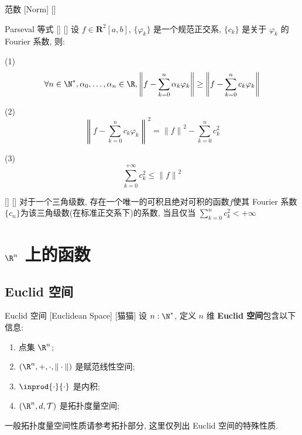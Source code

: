 \documentclass[UTF8]{ctexart}
\begin{document}
			\begin{dfn}
                    []
                    {范数}
                    [Norm]
                    []
			\end{dfn}

			\begin{thm}
			    []
			    {Parseval 等式}
			    []
			    []
				设 \(f\in\mathbf{R}^2[a,b]\), \(\{\varphi_k\}\) 是一个规范正交系, \(\{c_k\}\) 是关于 \(\varphi_k\) 的 Fourier 系数, 则: 
				
				(1)
				\[\forall n\in\N^*, \alpha_0,\dots,\alpha_n\in\R, \left\|f-\sum_{k=0}^{n}\alpha_k\varphi_k\right\|\geq\left\|f-\sum_{k=0}^{n}c_k\varphi_k\right\|\]

				(2)
				\[{\left\|f-\sum_{k=0}^{n}c_k\varphi_k\right\|}^2={\|f\|}^2-\sum_{k=0}^{n}c_k^2\]

				(3)
				\[\sum_{k=0}^{+\infty}c_k^2\leq{\|f\|}^2\]
			\end{thm}

			\begin{crl}
			    []
			    {}
			    []
			    []
				对于一个三角级数, 存在一个唯一的可积且绝对可积的函数\(f\)使其 Fourier 系数\(\{c_n\}\)为该三角级数(在标准正交系下)的系数, 当且仅当 \(\sum_{k=0}^{n}c_k^2<+\infty\)
			\end{crl}

    \section{\(\R^n\) 上的函数}

		\subsection{Euclid 空间}
			
			\begin{str}
				{Euclid 空间}
				[Euclidean Space]
				[猫猫]
				设 \(n:\N^*\), 定义 \(n\) 维 \textbf{Euclid 空间}包含以下信息: 
				\begin{enumerate}
					\item 点集 \(\R^n\); 
					\item \((\R^n, +, \cdot, \|\cdot\|)\) 是赋范线性空间; 
					\item \(\inprod{\cdot}{\cdot}\) 是内积;
					\item \((\R^n, d, \mathcal{T})\) 是拓扑度量空间; 
				\end{enumerate}
			\end{str}
			
			\begin{rmk}
				[猫猫]
				一般拓扑度量空间性质请参考拓扑部分, 这里仅列出 Euclid 空间的特殊性质. 
			\end{rmk}
\end{document}
